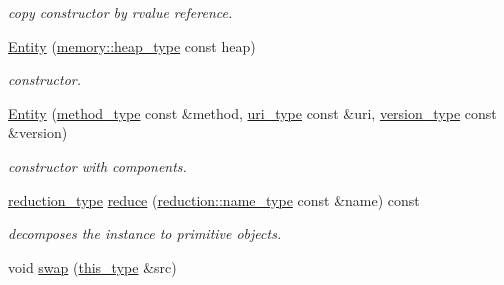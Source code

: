 \begin{DoxyCompactItemize}
\begin{DoxyCompactList}\small\item\em copy constructor by rvalue reference. \end{DoxyCompactList}\item 
\hypertarget{classhryky_1_1http_1_1request_1_1line_1_1_entity_a894af31e7ead64066d59afa456c60c24}{\hyperlink{classhryky_1_1http_1_1request_1_1line_1_1_entity_a894af31e7ead64066d59afa456c60c24}{Entity} (\hyperlink{classhryky_1_1memory_1_1heap_1_1_base}{memory\-::heap\-\_\-type} const heap)}\label{classhryky_1_1http_1_1request_1_1line_1_1_entity_a894af31e7ead64066d59afa456c60c24}

\begin{DoxyCompactList}\small\item\em constructor. \end{DoxyCompactList}\item 
\hypertarget{classhryky_1_1http_1_1request_1_1line_1_1_entity_aa5402334725864ac9579e679ad8620ab}{\hyperlink{classhryky_1_1http_1_1request_1_1line_1_1_entity_aa5402334725864ac9579e679ad8620ab}{Entity} (\hyperlink{classhryky_1_1http_1_1method_1_1_entity}{method\-\_\-type} const \&method, \hyperlink{classhryky_1_1uri_1_1_entity}{uri\-\_\-type} const \&uri, \hyperlink{classhryky_1_1http_1_1version_1_1_entity}{version\-\_\-type} const \&version)}\label{classhryky_1_1http_1_1request_1_1line_1_1_entity_aa5402334725864ac9579e679ad8620ab}

\begin{DoxyCompactList}\small\item\em constructor with components. \end{DoxyCompactList}\item 
\hypertarget{classhryky_1_1http_1_1request_1_1line_1_1_entity_ac9874713dd9fc3b4f077b805ca6c7967}{\hyperlink{namespacehryky_a343a9a4c36a586be5c2693156200eadc}{reduction\-\_\-type} \hyperlink{classhryky_1_1http_1_1request_1_1line_1_1_entity_ac9874713dd9fc3b4f077b805ca6c7967}{reduce} (\hyperlink{namespacehryky_1_1reduction_ac686c30a4c8d196bbd0f05629a6b921f}{reduction\-::name\-\_\-type} const \&name) const }\label{classhryky_1_1http_1_1request_1_1line_1_1_entity_ac9874713dd9fc3b4f077b805ca6c7967}

\begin{DoxyCompactList}\small\item\em decomposes the instance to primitive objects. \end{DoxyCompactList}\item 
\hypertarget{classhryky_1_1http_1_1request_1_1line_1_1_entity_a47591b333648718ec6bc317b07dbcddf}{void \hyperlink{classhryky_1_1http_1_1request_1_1line_1_1_entity_a47591b333648718ec6bc317b07dbcddf}{swap} (\hyperlink{classhryky_1_1http_1_1request_1_1line_1_1_entity_a807b69de6e0754ec49a68d721dc32eed}{this\-\_\-type} \&src)}\label{classhryky_1_1http_1_1request_1_1line_1_1_entity_a47591b333648718ec6bc317b07dbcddf}


\end{DoxyCompactItemize}
